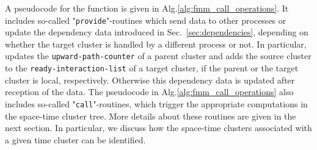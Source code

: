 \documentclass[a4paper,11pt]{article}
\theoremstyle{plain}
\theoremstyle{definition}
\theoremstyle{remark}
\begin{document}
A pseudocode for the function  is given in Alg.\ref{alg:fmm_call_operations}. It includes  so-called "\texttt{provide}"-routines which send data to other processes or update the dependency data introduced in Sec.~\ref{sec:dependencies}, depending on whether the target cluster is handled by a different process or not. In particular,  updates the \texttt{upward-path-counter} of a parent cluster and  adds the source cluster to the \texttt{ready-interaction-list} of a target cluster, if the parent or the target cluster is local, respectively. Otherwise this dependency data is updated after reception of the data. The pseudocode in Alg.\ref{alg:fmm_call_operations} also includes so-called "\texttt{call}"-routines, which trigger the appropriate computations in the space-time cluster tree. More details about these routines are given in the next section. In particular, we discuss how the space-time clusters associated with a given time cluster can be identified.
\end{document}
